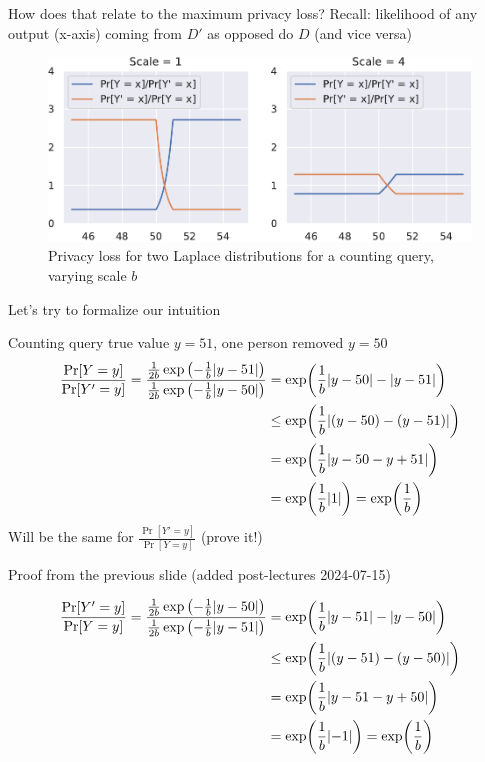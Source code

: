 \documentclass[12pt,aspectratio=169,handout]{beamer}
\begin{document}
\begin{frame}{How does that relate to the maximum privacy loss?}
Recall: likelihood of any output (x-axis) coming from $D'$ as opposed do $D$ (and vice versa)

\begin{figure}
\includegraphics[width=0.9\linewidth]{img/privacy-loss1.pdf}
\caption{Privacy loss for two Laplace distributions for a counting query, varying scale $b$}
\end{figure}

\end{frame}



\begin{frame}{Let's try to formalize our intuition}

Counting query true value $y= 51$, one person removed $y = 50$
$$
\begin{aligned}
\frac{\Pr[Y = y]}{\Pr[Y' = y]} =
\frac{
\frac{1}{2b} \exp \left(- \frac{1}{b} \abs{y - 51} \right)
}{
\frac{1}{2b} \exp \left(- \frac{1}{b} \abs{y - 50} \right) 
}
&= \exp (\frac{1}{b} \abs{y - 50} - \abs{y - 51} ) \\
&\leq \exp (\frac{1}{b} \abs{(y - 50) - (y - 51)} ) \\
&= \exp (\frac{1}{b} \abs{y - 50 - y + 51} ) \\
&= \exp (\frac{1}{b} \abs{1}) = \exp(\frac{1}{b}) \\
\end{aligned}
$$
Will be the same for $\frac{\Pr[Y' = y]}{\Pr[Y = y]}$ (prove it!)

\end{frame}



\begin{frame}{Proof from the previous slide (added post-lectures 2024-07-15)}

$$
\begin{aligned}
\frac{\Pr[Y' = y]}{\Pr[Y = y]} =
\frac{
\frac{1}{2b} \exp \left(- \frac{1}{b} \abs{y - 50} \right)
}{
\frac{1}{2b} \exp \left(- \frac{1}{b} \abs{y - 51} \right)
}
&= \exp (\frac{1}{b} \abs{y - 51} - \abs{y - 50} ) \\
&\leq \exp (\frac{1}{b} \abs{(y - 51) - (y - 50)} ) \\
&= \exp (\frac{1}{b} \abs{y - 51 - y + 50} ) \\
&= \exp (\frac{1}{b} \abs{-1}) = \exp(\frac{1}{b}) \\
\end{aligned}
$$

\end{frame}
\end{document}
